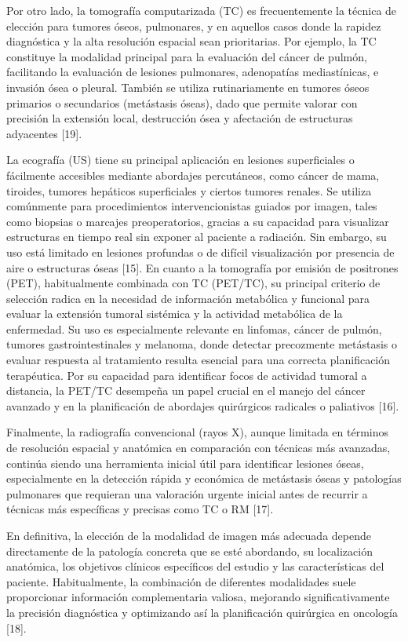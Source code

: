 Por otro lado, la tomografía computarizada (TC) es frecuentemente la técnica de elección para tumores óseos, pulmonares, y en aquellos casos donde la rapidez diagnóstica y la alta resolución espacial sean prioritarias. Por ejemplo, la TC constituye la modalidad principal para la evaluación del cáncer de pulmón, facilitando la evaluación de lesiones pulmonares, adenopatías mediastínicas, e invasión ósea o pleural. También se utiliza rutinariamente en tumores óseos primarios o secundarios (metástasis óseas), dado que permite valorar con precisión la extensión local, destrucción ósea y afectación de estructuras adyacentes [19]. 

La ecografía (US) tiene su principal aplicación en lesiones superficiales o fácilmente accesibles mediante abordajes percutáneos, como cáncer de mama, tiroides, tumores hepáticos superficiales y ciertos tumores renales. Se utiliza comúnmente para procedimientos intervencionistas guiados por imagen, tales como biopsias o marcajes preoperatorios, gracias a su capacidad para visualizar estructuras en tiempo real sin exponer al paciente a radiación. Sin embargo, su uso está limitado en lesiones profundas o de difícil visualización por presencia de aire o estructuras óseas [15]. En cuanto a la tomografía por emisión de positrones (PET), habitualmente combinada con TC (PET/TC), su principal criterio de selección radica en la necesidad de información metabólica y funcional para evaluar la extensión tumoral sistémica y la actividad metabólica de la enfermedad. Su uso es especialmente relevante en linfomas, cáncer de pulmón, tumores gastrointestinales y melanoma, donde detectar precozmente metástasis o evaluar respuesta al tratamiento resulta esencial para una correcta planificación terapéutica. Por su capacidad para identificar focos de actividad tumoral a distancia, la PET/TC desempeña un papel crucial en el manejo del cáncer avanzado y en la planificación de abordajes quirúrgicos radicales o paliativos [16]. 

Finalmente, la radiografía convencional (rayos X), aunque limitada en términos de resolución espacial y anatómica en comparación con técnicas más avanzadas, continúa siendo una herramienta inicial útil para identificar lesiones óseas, especialmente en la detección rápida y económica de metástasis óseas y patologías pulmonares que requieran una valoración urgente inicial antes de recurrir a técnicas más específicas y precisas como TC o RM [17]. 

En definitiva, la elección de la modalidad de imagen más adecuada depende directamente de la patología concreta que se esté abordando, su localización anatómica, los objetivos clínicos específicos del estudio y las características del paciente. Habitualmente, la combinación de diferentes modalidades suele proporcionar información complementaria valiosa, mejorando significativamente la precisión diagnóstica y optimizando así la planificación quirúrgica en oncología [18]. 

